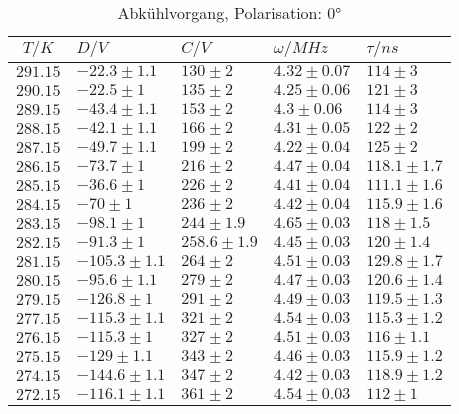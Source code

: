 \begin{table}[h!]
\footnotesize\centering
\begin{tabular}{|c|l|l|l|l|}
\hline
$T/K$&$D/V$&$C/V$&$\omega/MHz$&$\tau/ns$\\\hline\hline
$291.15$&$-22.3\pm1.1$&$130\pm2$&$4.32\pm0.07$&$114\pm3$\\\hline
$290.15$&$-22.5\pm1$&$135\pm2$&$4.25\pm0.06$&$121\pm3$\\\hline
$289.15$&$-43.4\pm1.1$&$153\pm2$&$4.3\pm0.06$&$114\pm3$\\\hline
$288.15$&$-42.1\pm1.1$&$166\pm2$&$4.31\pm0.05$&$122\pm2$\\\hline
$287.15$&$-49.7\pm1.1$&$199\pm2$&$4.22\pm0.04$&$125\pm2$\\\hline
$286.15$&$-73.7\pm1$&$216\pm2$&$4.47\pm0.04$&$118.1\pm1.7$\\\hline
$285.15$&$-36.6\pm1$&$226\pm2$&$4.41\pm0.04$&$111.1\pm1.6$\\\hline
$284.15$&$-70\pm1$&$236\pm2$&$4.42\pm0.04$&$115.9\pm1.6$\\\hline
$283.15$&$-98.1\pm1$&$244\pm1.9$&$4.65\pm0.03$&$118\pm1.5$\\\hline
$282.15$&$-91.3\pm1$&$258.6\pm1.9$&$4.45\pm0.03$&$120\pm1.4$\\\hline
$281.15$&$-105.3\pm1.1$&$264\pm2$&$4.51\pm0.03$&$129.8\pm1.7$\\\hline
$280.15$&$-95.6\pm1.1$&$279\pm2$&$4.47\pm0.03$&$120.6\pm1.4$\\\hline
$279.15$&$-126.8\pm1$&$291\pm2$&$4.49\pm0.03$&$119.5\pm1.3$\\\hline
$277.15$&$-115.3\pm1.1$&$321\pm2$&$4.54\pm0.03$&$115.3\pm1.2$\\\hline
$276.15$&$-115.3\pm1$&$327\pm2$&$4.51\pm0.03$&$116\pm1.1$\\\hline
$275.15$&$-129\pm1.1$&$343\pm2$&$4.46\pm0.03$&$115.9\pm1.2$\\\hline
$274.15$&$-144.6\pm1.1$&$347\pm2$&$4.42\pm0.03$&$118.9\pm1.2$\\\hline
$272.15$&$-116.1\pm1.1$&$361\pm2$&$4.54\pm0.03$&$112\pm1$\\\hline
\end{tabular}
\caption{Abkühlvorgang, Polarisation: 0°\label{cold0}}
\end{table}
